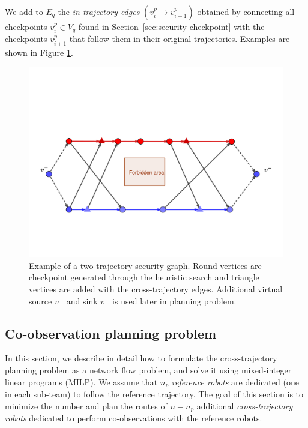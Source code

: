 \documentclass[journal]{IEEEtran}  %
\begin{document}
We add to $E_q$ the \emph{in-trajectory edges} $(v^{p}_{i}\rightarrow v^{p}_{i+1})$ obtained by connecting all checkpoints $v^p_{i}\in V_q$ found in Section~\ref{sec:security-checkpoint} with the checkpoints $v^p_{i+1}$ that  follow them in their original trajectories.
Examples are shown in Figure \ref{fig:security-graph-generate}.
\begin{figure}[htbp]
\begin{center}
\includegraphics[width=0.6\linewidth]{security_graph}
\caption{Example of a two trajectory security graph. Round vertices are checkpoint generated through the heuristic search and triangle vertices are added with the cross-trajectory edges. Additional virtual source $v^{+}$ and sink $v^{-}$ is used later in planning problem.}
\label{fig:security-graph-generate}
\end{center}
\end{figure}


\subsection{Co-observation planning problem}
In this section, we describe in detail how to formulate the cross-trajectory planning problem as a network flow problem, and solve it using mixed-integer linear programs (MILP). We assume that $n_p$ \emph{reference robots} are dedicated (one in each sub-team) to follow the reference trajectory.  The goal of this section is to minimize the number and plan the routes of $n-n_p$  additional \emph{cross-trajectory robots} dedicated to perform co-observations with the reference robots. 
\end{document}
